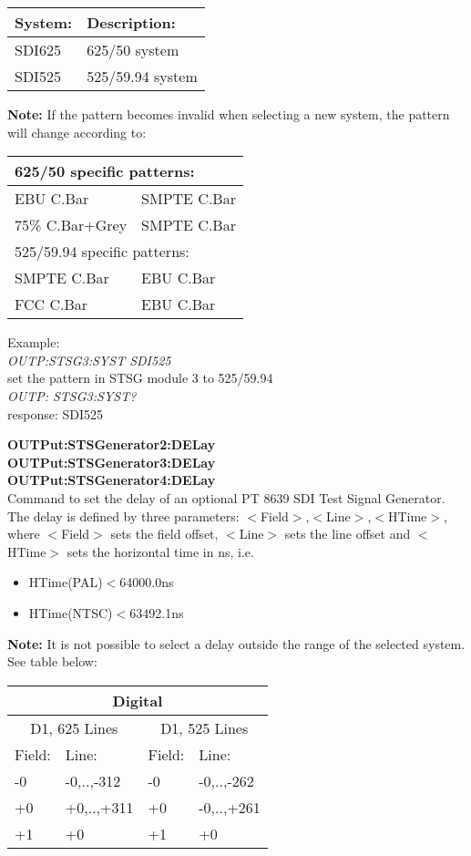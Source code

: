 \begin{tabular}{|l|l|}
\hline
\textbf{System:} & \textbf{Description:} \\ \hline
SDI625 & 625/50 system \\ \hline
SDI525 & 525/59.94 system \\ \hline
\end{tabular}

\textbf{Note:} If the pattern becomes invalid when selecting a new system, the pattern will change according to:

\begin{tabular}{|l@{$\rightarrow$}l|}
\hline
\multicolumn{2}{|l|}{625/50 specific patterns:} \\ \hline
EBU C.Bar & SMPTE C.Bar \\ \hline
75\% C.Bar+Grey & SMPTE C.Bar \\ \hline
\multicolumn{2}{|l|}{525/59.94 specific patterns:} \\ \hline
SMPTE C.Bar & EBU C.Bar \\ \hline
FCC C.Bar & EBU C.Bar \\ \hline
\end{tabular}

Example:\\
\textit{OUTP:STSG3:SYST SDI525}\\
set the pattern in STSG module 3 to 525/59.94\\
\textit{OUTP: STSG3:SYST?}\\
response: SDI525

\textbf{OUTPut:STSGenerator2:DELay}\\
\textbf{OUTPut:STSGenerator3:DELay}\\
\textbf{OUTPut:STSGenerator4:DELay}\\
Command to set the delay of an optional PT 8639 SDI Test Signal Generator. The delay is defined by three parameters:
$<$Field$>$,$<$Line$>$,$<$HTime$>$, where $<$Field$>$ sets the field offset, $<$Line$>$ sets the line offset and $<$HTime$>$ sets the horizontal time in ns, i.e.
\begin{itemize}
\item HTime(PAL)$<$64000.0ns
\item HTime(NTSC)$<$63492.1ns
\end{itemize}

\textbf{Note:} It is not possible to select a delay outside the range of the selected system. See table below:

\begin{tabular}{|p{5em}|p{5em}|p{5em}|p{5em}|}
\hline
\multicolumn{4}{|c|}{Digital} \\ \hline
\multicolumn{2}{|c|}{D1, 625 Lines} & \multicolumn{2}{|c|}{D1, 525 Lines} \\ \hline
Field:	& Line:				& Field:	& Line: \\ \hline
-0			& -0,..,-312	& -0			& -0,..,-262 \\ \hline
+0			& +0,..,+311	& +0			& -0,..,+261 \\ \hline
+1			& +0					& +1			& +0 \\ \hline
\end{tabular}

